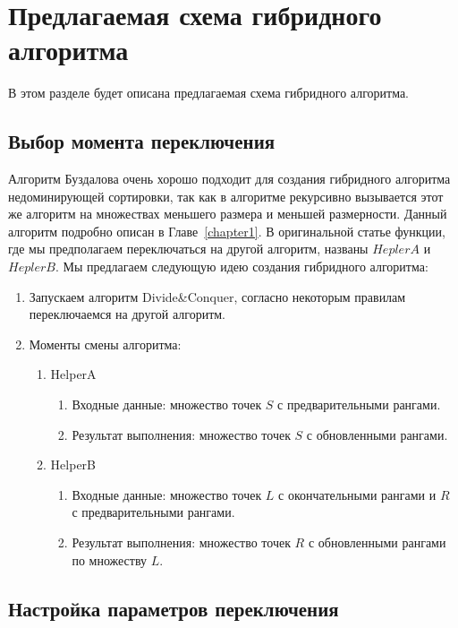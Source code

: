 \section{Предлагаемая схема гибридного алгоритма}

В этом разделе будет описана предлагаемая схема гибридного алгоритма.

\subsection{Выбор момента переключения}

Алгоритм Буздалова очень хорошо подходит для создания гибридного алгоритма недоминирующей сортировки, так как в алгоритме рекурсивно вызывается этот же алгоритм на множествах меньшего размера и меньшей размерности. Данный алгоритм подробно описан в Главе~\ref{chapter1}. В оригинальной статье функции, где мы предполагаем переключаться на другой алгоритм, названы $HeplerA$ и $HeplerB$. Мы предлагаем следующую идею создания гибридного алгоритма: 
\begin{enumerate}
  \item Запускаем алгоритм Divide\&Conquer, согласно некоторым правилам переключаемся на другой алгоритм.
  \item Моменты смены алгоритма:
    \begin{enumerate}
    \item HelperA
      \begin{enumerate}
      \item Входные данные: множество точек $S$ с предварительными рангами.
      \item Результат выполнения: множество точек $S$ с обновленными рангами.
      \end{enumerate}
    \item HelperB  
      \begin{enumerate}
      \item Входные данные: множество точек $L$ с окончательными рангами и $R$ с предварительными рангами.
      \item Результат выполнения: множество точек $R$ с обновленными рангами по множеству $L$.
      \end{enumerate}
    \end{enumerate}
\end{enumerate}


\subsection{Настройка параметров переключения}

